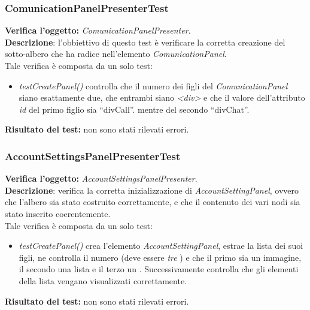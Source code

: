 \subsubsection{ComunicationPanelPresenterTest}
\textbf{Verifica l'oggetto:} \textit{ComunicationPanelPresenter}.\\
\textbf{Descrizione}: l'obbiettivo di questo test è verificare la corretta creazione del sotto-albero che ha radice nell'elemento \textit{ComunicationPanel}.\\
Tale verifica è composta da un solo test:
\begin{itemize}
\item \textit{testCreatePanel() } controlla che il numero dei figli del \textit{ComunicationPanel} siano esattamente due, che entrambi siano \textit{<div>} e che il valore dell'attributo \textit{id} del primo figlio sia ``divCall''. mentre del secondo ``divChat''. 
\end{itemize}
\textbf{Risultato del test:} non sono stati rilevati errori.


\subsubsection{AccountSettingsPanelPresenterTest}
\textbf{Verifica l'oggetto:} \textit{AccountSettingsPanelPresenter}.\\
\textbf{Descrizione}: verifica la corretta inizializzazione di \textit{AccountSettingPanel}, ovvero che l'albero sia stato costruito correttamente, e che il contenuto dei vari nodi sia stato inserito coerentemente.\\
Tale verifica è composta da un solo test:
\begin{itemize}
\item \textit{testCreatePanel() } crea l'elemento \textit{AccountSettingPanel}, estrae la lista dei suoi figli, ne controlla il numero (deve essere \textit{tre} ) e che il primo sia un immagine, il secondo una lista e il terzo un .
Successivamente controlla che gli elementi della lista vengano visualizzati correttamente.
\end{itemize}
\textbf{Risultato del test:} non sono stati rilevati errori.


